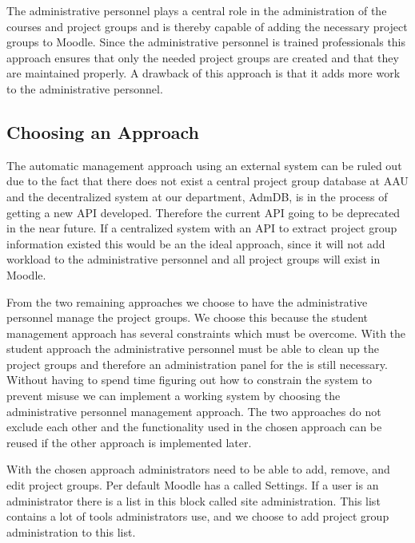 The administrative personnel plays a central role in the administration of the courses and project groups and is thereby capable of adding the necessary project groups to Moodle. 
Since the administrative personnel is trained professionals this approach ensures that only the needed project groups are created and that they are maintained properly. 
A drawback of this approach is that it adds more work to the administrative personnel.


\subsection{Choosing an Approach}
The automatic management approach using an external system can be ruled out due to the fact that there does not exist a central project group database at AAU and the decentralized system at our department, AdmDB, is in the process of getting a new API developed.
Therefore the current API going to be deprecated in the near future. 
If a centralized system with an API to extract project group information existed this would be an the ideal approach, since it will not add workload to the administrative personnel and all project groups will exist in Moodle. 

From the two remaining approaches we choose to have the administrative personnel manage the project groups. 
We choose this because the student management approach has several constraints which must be overcome. 
With the student approach the administrative personnel must be able to clean up the project groups and therefore an administration panel for the \admpers{} is still necessary.
Without having to spend time figuring out how to constrain the system to prevent misuse we can implement a working system by choosing the administrative personnel management approach.
The two approaches do not exclude each other and the functionality used in the chosen approach can be reused if the other approach is implemented later.

With the chosen approach administrators need to be able to add, remove, and edit project groups.
Per default Moodle has a \block{} called Settings. 
If a user is an administrator there is a list in this block called site administration. 
This list contains a lot of tools administrators use, and we choose to add project group administration to this list. 

